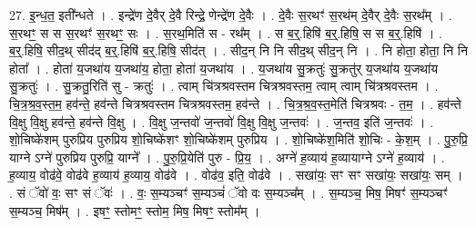 \documentclass[17pt]{extarticle}
\begin{document}
27. इ॒न्ध॒त॒ इती᳚न्धते । . इन्द्रे॑ण दे॒वैर् दे॒वै रिन्द्रे॒ णेन्द्रे॑ण दे॒वैः । . दे॒वैः स॒रथꣳ॑ स॒रथ॑म् दे॒वैर् दे॒वैः स॒रथ᳚म् । . स॒रथꣳ॒॒ स स स॒रथꣳ॑ स॒रथꣳ॒॒ सः । . स॒रथ॒मिति॑ स - रथ᳚म् । . स ब॒र्॒.हिषि॑ ब॒र्॒.हिषि॒ स स ब॒र्॒.हिषि॑ । . ब॒र्॒.हिषि॒ सीद॒थ् सीद॑द् ब॒र्॒.हिषि॑ ब॒र्॒.हिषि॒ सीद॑त् । . सीद॒न् नि नि सीद॒थ् सीद॒न् नि । . नि होता॒ होता॒ नि नि होता᳚ । . होता॑ य॒जथा॑य य॒जथा॑य॒ होता॒ होता॑ य॒जथा॑य । . य॒जथा॑य सु॒क्रतुः॑ सु॒क्रतु॑र् य॒जथा॑य य॒जथा॑य सु॒क्रतुः॑ । . सु॒क्रतु॒रिति॑ सु - क्रतुः॑ । . त्वाम् चि॑त्रश्रवस्तम चित्रश्रवस्तम॒ त्वाम् त्वाम् चि॑त्रश्रवस्तम । . चि॒त्र॒श्र॒व॒स्त॒म॒ हव॑न्ते॒ हव॑न्ते चित्रश्रवस्तम चित्रश्रवस्तम॒ हव॑न्ते । . चि॒त्र॒श्र॒व॒स्त॒मेति॑ चित्रश्रवः - त॒म॒ । . हव॑न्ते वि॒क्षु वि॒क्षु हव॑न्ते॒ हव॑न्ते वि॒क्षु । . वि॒क्षु ज॒न्तवो॑ ज॒न्तवो॑ वि॒क्षु वि॒क्षु ज॒न्तवः॑ । . ज॒न्तव॒ इति॑ ज॒न्तवः॑ । . शो॒चिष्के॑शम् पुरुप्रिय पुरुप्रिय शो॒चिष्के॑शꣳ शो॒चिष्के॑शम् पुरुप्रिय । . शो॒चिष्के॑श॒मिति॑ शो॒चिः - के॒श॒म् । . पु॒रु॒प्रि॒ याग्ने ऽग्ने॑ पुरुप्रिय पुरुप्रि॒ याग्ने᳚ । . पु॒रु॒प्रि॒येति॑ पुरु - प्रि॒य॒ । . अग्ने॑ ह॒व्याय॑ ह॒व्यायाग्ने ऽग्ने॑ ह॒व्याय॑ । . ह॒व्याय॒ वोढ॑वे॒ वोढ॑वे ह॒व्याय॑ ह॒व्याय॒ वोढ॑वे । . वोढ॑व॒ इति॒ वोढ॑वे । . सखा॑यः॒ सꣳ सꣳ सखा॑यः॒ सखा॑यः॒ सम् । . सं ॅवो॑ वः॒ सꣳ सं ॅवः॑ । . वः॒ स॒म्यञ्चꣳ॑ स॒म्यञ्चं॑ ॅवो वः स॒म्यञ्च᳚म् । . स॒म्यञ्च॒ मिष॒ मिषꣳ॑ स॒म्यञ्चꣳ॑ स॒म्यञ्च॒ मिष᳚म् । . इषꣳ॒॒ स्तोमꣳ॒॒ स्तोम॒ मिष॒ मिषꣳ॒॒ स्तोम᳚म् । \newline
\end{document}
